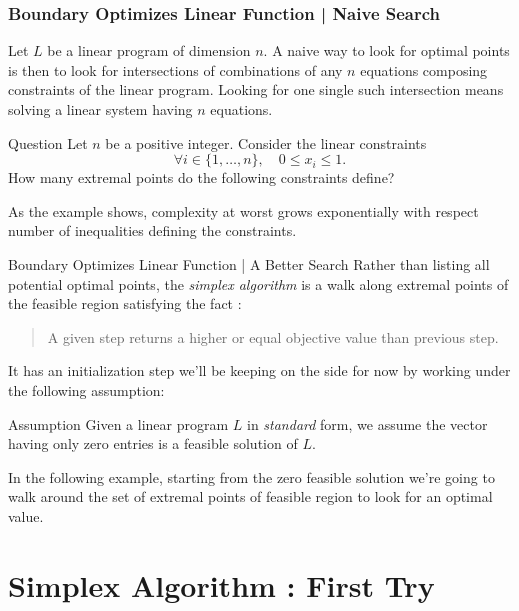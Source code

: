 \documentclass[aspectratio = 169]{beamer}
\begin{document}
\begin{frame}
  \frametitle{Boundary Optimizes Linear Function | Naive Search}
  Let $L$ be a linear program of dimension $n$. A naive way to look
  for optimal points is then to look for intersections of combinations
  of any $n$ equations composing constraints of the linear
  program. \pause Looking for one single such intersection means
  solving a linear system having $n$ equations.
  \pause
  \begin{halfshyblock}{Question}
    Let $n$ be a positive integer. Consider the linear constraints
    \[
    \forall i \in \{1, \ldots, n\}, \quad 0 \leq x_i \leq 1.
    \]
    How many extremal points do the following constraints define?
  \end{halfshyblock}
  \pause As the example shows, complexity at worst grows exponentially
  with respect number of inequalities defining the constraints.
\end{frame}

\begin{frame}{Boundary Optimizes Linear Function | A Better Search}
  Rather than listing all potential optimal points, the \emph{simplex
    algorithm} is a walk along extremal points of the feasible region
  satisfying the fact :
  \begin{quotation}
    A given step returns a higher or equal objective value than
    previous step.
  \end{quotation}
  It has an initialization step we'll be keeping on the side for now
  by working under the following assumption:
  \begin{alertblock}{Assumption}
    Given a linear program $L$ in \textit{standard} form, we assume
    the vector having only zero entries is a feasible solution of $L$.
  \end{alertblock}
  \pause
  In the following example, starting from the zero feasible
  solution we're going to walk around the set of extremal points of
  feasible region to look for an optimal value.
\end{frame}

\section{Simplex Algorithm : First Try}
\end{document}
